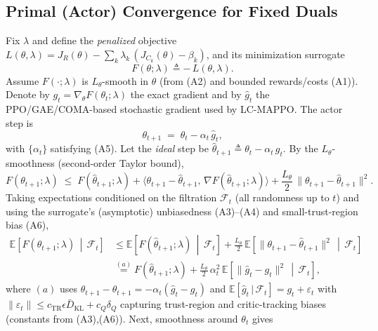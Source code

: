 \documentclass{article} %
\begin{document}

\subsection{Primal (Actor) Convergence for Fixed Duals}
\label{sec:Actor}

Fix $\lambda$ and define the \emph{penalized} objective $L(\theta,\lambda)=J_R(\theta)-\sum_k \lambda_k\,(J_{C_k}(\theta)-\beta_k)$, and its minimization surrogate
\begin{equation}
\label{eq:defF}
F(\theta;\lambda)\triangleq -\,L(\theta,\lambda).
\end{equation}
Assume $F(\cdot;\lambda)$ is $L_\theta$-smooth in $\theta$ (from (A2) and bounded rewards/costs (A1)). Denote by $g_t\!=\!\nabla_\theta F(\theta_t;\lambda)$ the exact gradient and by $\widehat{g}_t$ the PPO/GAE/COMA-based stochastic gradient used by LC-MAPPO. The actor step is
\begin{equation}
\label{eq:actor_step}
\theta_{t+1} \;=\; \theta_t - \alpha_t\,\widehat{g}_t,
\end{equation}
with $\{\alpha_t\}$ satisfying (A5). Let the \emph{ideal} step be $\widehat{\theta}_{t+1}\triangleq \theta_t - \alpha_t\,g_t$. By the $L_\theta$-smoothness (second-order Taylor bound),
\begin{equation}
\label{eq:taylor1}
F(\theta_{t+1};\lambda)
\;\le\; F(\widehat{\theta}_{t+1};\lambda)
+ \big\langle \theta_{t+1}-\widehat{\theta}_{t+1},\, \nabla F(\widehat{\theta}_{t+1};\lambda) \big\rangle
+ \frac{L_\theta}{2}\,\|\theta_{t+1}-\widehat{\theta}_{t+1}\|^2.
\end{equation}
Taking expectations conditioned on the filtration $\mathcal F_t$ (all randomness up to $t$) and using the surrogate’s (asymptotic) unbiasedness (A3)–(A4) and small-trust-region bias (A6),
\begin{align}
\mathbb E\!\left[F(\theta_{t+1};\lambda)\,\middle|\,\mathcal F_t\right]
&\le \mathbb E\!\left[F(\widehat{\theta}_{t+1};\lambda)\,\middle|\,\mathcal F_t\right]
+ \frac{L_\theta}{2}\,\mathbb E\!\left[\|\theta_{t+1}-\widehat{\theta}_{t+1}\|^2\,\middle|\,\mathcal F_t\right] \nonumber\\[-0.2em]
&\stackrel{(a)}{=} F(\widehat{\theta}_{t+1};\lambda)
+ \frac{L_\theta}{2}\,\alpha_t^2\,\mathbb E\!\left[\|\widehat{g}_t - g_t\|^2\,\middle|\,\mathcal F_t\right], \label{eq:step_a}
\end{align}
where $(a)$ uses $\theta_{t+1}-\widehat{\theta}_{t+1}=-\alpha_t(\widehat{g}_t-g_t)$ and $\mathbb E[\widehat{g}_t\,|\,\mathcal F_t]=g_t+\varepsilon_t$ with $\|\varepsilon_t\|\le c_{\text{TR}}\epsilon\bar D_{\mathrm{KL}}+c_Q\delta_Q$ capturing trust-region and critic-tracking biases (constants from (A3),(A6)). Next, smoothness around $\theta_t$ gives
\end{document}
